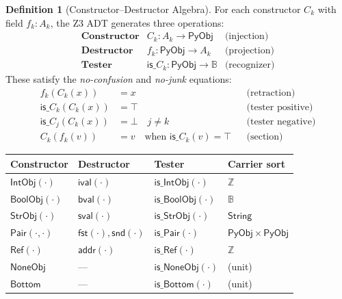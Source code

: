\documentclass[11pt,a4paper]{report}
\theoremstyle{definition}
\newtheorem{definition}{Definition}[chapter]
\theoremstyle{plain}
\newcommand{\Int}{\mathbb{Z}}
\newcommand{\Bool}{\mathbb{B}}
\newcommand{\PyObj}{\mathsf{PyObj}}
\begin{document}
\begin{definition}[Constructor--Destructor Algebra]
\label{def:ctor-dtor}
For each constructor $C_k$ with field $f_k : A_k$, the Z3 ADT
generates three operations:
\[
\begin{array}{lll}
  \textbf{Constructor} & C_k : A_k \to \PyObj
    & \text{(injection)} \\
  \textbf{Destructor} & f_k : \PyObj \to A_k
    & \text{(projection)} \\
  \textbf{Tester} & \mathsf{is\_}C_k : \PyObj \to \Bool
    & \text{(recognizer)}
\end{array}
\]
These satisfy the \emph{no-confusion} and \emph{no-junk} equations:
\begin{align}
  f_k(C_k(x)) &= x
    && \text{(retraction)} \tag{CD1} \\
  \mathsf{is\_}C_k(C_k(x)) &= \top
    && \text{(tester positive)} \tag{CD2} \\
  \mathsf{is\_}C_j(C_k(x)) &= \bot \quad j \neq k
    && \text{(tester negative)} \tag{CD3} \\
  C_k(f_k(v)) &= v \quad \text{when } \mathsf{is\_}C_k(v) = \top
    && \text{(section)} \tag{CD4}
\end{align}
\end{definition}

\begin{center}
\small
\begin{tabular}{l l l l}
  \textbf{Constructor} & \textbf{Destructor} & \textbf{Tester} &
  \textbf{Carrier sort} \\
  \hline
  $\mathsf{IntObj}(\cdot)$ & $\mathsf{ival}(\cdot)$ &
    $\mathsf{is\_IntObj}(\cdot)$ & $\Int$ \\
  $\mathsf{BoolObj}(\cdot)$ & $\mathsf{bval}(\cdot)$ &
    $\mathsf{is\_BoolObj}(\cdot)$ & $\Bool$ \\
  $\mathsf{StrObj}(\cdot)$ & $\mathsf{sval}(\cdot)$ &
    $\mathsf{is\_StrObj}(\cdot)$ & $\mathsf{String}$ \\
  $\mathsf{Pair}(\cdot, \cdot)$ & $\mathsf{fst}(\cdot),
    \mathsf{snd}(\cdot)$ &
    $\mathsf{is\_Pair}(\cdot)$ & $\PyObj \times \PyObj$ \\
  $\mathsf{Ref}(\cdot)$ & $\mathsf{addr}(\cdot)$ &
    $\mathsf{is\_Ref}(\cdot)$ & $\Int$ \\
  $\mathsf{NoneObj}$ & --- &
    $\mathsf{is\_NoneObj}(\cdot)$ & (unit) \\
  $\mathsf{Bottom}$ & --- &
    $\mathsf{is\_Bottom}(\cdot)$ & (unit)
\end{tabular}
\end{center}
\end{document}
